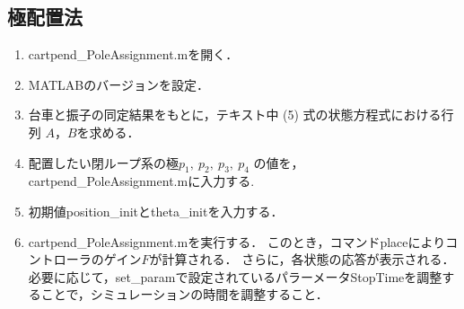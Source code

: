 \documentclass[a4,10pt]{article}
\begin{document}
\subsection*{極配置法}
\begin{enumerate}
    \item cartpend\_PoleAssignment.mを開く．
    
    \item MATLABのバージョンを設定．

    \item  台車と振子の同定結果をもとに，テキスト中 (5) 式の状態方程式における行列 $A$，$B$を求める．
    

    \item  配置したい閉ループ系の極$p_1,~ p_2,~ p_3,~ p_4$ の値を，cartpend\_PoleAssignment.mに入力する.
    
    \item  初期値position\_initとtheta\_initを入力する．
    
    \item cartpend\_PoleAssignment.mを実行する．
    このとき，コマンドplaceによりコントローラのゲイン$F$が計算される．
    さらに，各状態の応答が表示される．
    必要に応じて，set\_paramで設定されているパラーメータStopTimeを調整することで，シミュレーションの時間を調整すること．
    

\end{enumerate}
\end{document}
